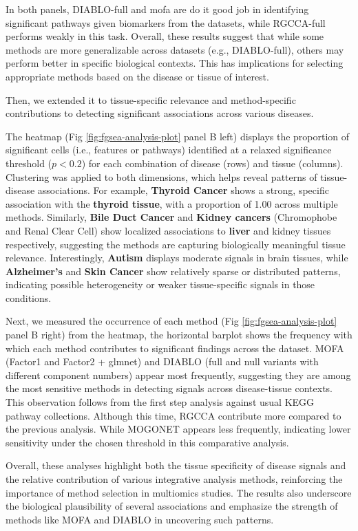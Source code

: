 \documentclass[
]{article}
\begin{document}
In both panels, DIABLO-full and mofa are do it good job in identifying significant pathways given biomarkers from the datasets, while RGCCA-full performs weakly in this task. Overall, these results suggest that while some methods are more generalizable across datasets (e.g., DIABLO-full), others may perform better in specific biological contexts. This has implications for selecting appropriate methods based on the disease or tissue of interest.

Then, we extended it to tissue-specific relevance and method-specific contributions to detecting significant associations across various diseases.

The heatmap (Fig \ref{fig:fgsea-analysis-plot} panel B left) displays the proportion of significant cells (i.e., features or pathways) identified at a relaxed significance threshold (\(p < 0.2\)) for each combination of disease (rows) and tissue (columns). Clustering was applied to both dimensions, which helps reveal patterns of tissue-disease associations. For example, \textbf{Thyroid Cancer} shows a strong, specific association with the \textbf{thyroid tissue}, with a proportion of 1.00 across multiple methods. Similarly, \textbf{Bile Duct Cancer} and \textbf{Kidney cancers} (Chromophobe and Renal Clear Cell) show localized associations to \textbf{liver} and kidney tissues respectively, suggesting the methods are capturing biologically meaningful tissue relevance. Interestingly, \textbf{Autism} displays moderate signals in brain tissues, while \textbf{Alzheimer's} and \textbf{Skin Cancer} show relatively sparse or distributed patterns, indicating possible heterogeneity or weaker tissue-specific signals in those conditions.

Next, we measured the occurrence of each method (Fig \ref{fig:fgsea-analysis-plot} panel B right) from the heatmap, the horizontal barplot shows the frequency with which each method contributes to significant findings across the dataset. MOFA (Factor1 and Factor2 + glmnet) and DIABLO (full and null variants with different component numbers) appear most frequently, suggesting they are among the most sensitive methods in detecting signals across disease-tissue contexts. This observation follows from the first step analysis against usual KEGG pathway collections. Although this time, RGCCA contribute more compared to the previous analysis. While MOGONET appears less frequently, indicating lower sensitivity under the chosen threshold in this comparative analysis.

Overall, these analyses highlight both the tissue specificity of disease signals and the relative contribution of various integrative analysis methods, reinforcing the importance of method selection in multiomics studies. The results also underscore the biological plausibility of several associations and emphasize the strength of methods like MOFA and DIABLO in uncovering such patterns.
\end{document}
